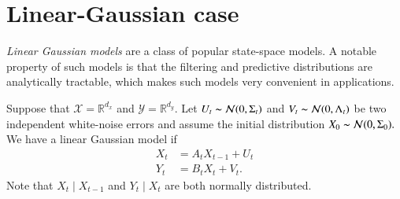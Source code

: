 \documentclass[
]{book}
\theoremstyle{break}
\theoremstyle{nonumberplain}
\begin{document}
\chapter{Linear-Gaussian case}\label{KF_chapter}

\textit{Linear Gaussian models} are a class of popular state-space
models. A notable property of such models is that the filtering and
predictive distributions are analytically tractable, which makes such
models very convenient in applications.

Suppose that \(\mathcal X=\mathbb R^{d_x}\) and
\(\mathcal Y=\mathbb R^{d_y}.\) Let
\(U_t\thicksim\mathcal N(0,\Sigma_t)\) and
\(V_t\thicksim\mathcal N(0,\Lambda_t)\) be two independent white-noise
errors and assume the initial distribution
\(X_0\thicksim\mathcal N(0,\Sigma_0).\) We have a linear Gaussian model
if \begin{align}
X_t &= A_tX_{t-1}+U_t \\
Y_t &= B_tX_t + V_t.
\end{align} Note that \(X_t\mid X_{t-1}\) and \(Y_t\mid X_t\) are both
normally distributed.\\
\end{document}
